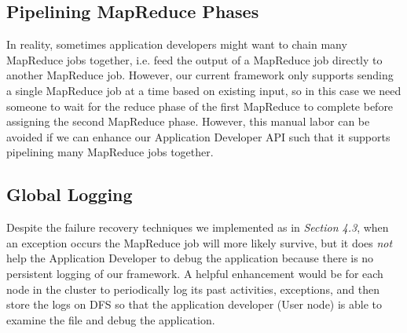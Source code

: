 \documentclass{article} %
\begin{document}
\subsection{Pipelining MapReduce Phases}
    \par\qquad In reality, sometimes application developers might want to chain many MapReduce jobs together, i.e. feed the output of a MapReduce job directly to another MapReduce job. However, our current framework only supports sending a single MapReduce job at a time based on existing input, so in this case we need someone to wait for the reduce phase of the first MapReduce to complete before assigning the second MapReduce phase. However, this manual labor can be avoided if we can enhance our Application Developer API such that it supports pipelining many MapReduce jobs together.

\subsection{Global Logging}
    \par\qquad Despite the failure recovery techniques we implemented as in \emph{Section 4.3}, when an exception occurs the MapReduce job will more likely survive, but it does \emph{not} help the Application Developer to debug the application because there is no persistent logging of our framework. A helpful enhancement would be for each node in the cluster to periodically log its past activities, exceptions, and then store the logs on DFS so that the application developer (User node) is able to examine the file and debug the application.

\end{document}
